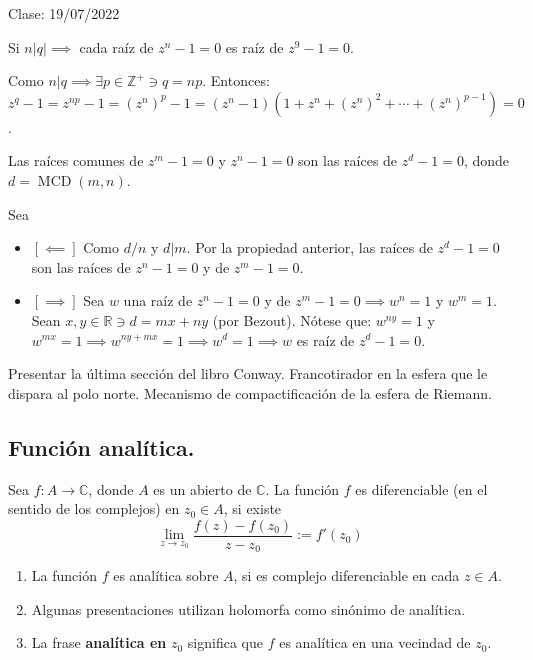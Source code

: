 Clase: 19/07/2022


\begin{prop}
    Si $n|q|\implies $ cada raíz de $z^n-1=0$ es raíz de $z^9 -1 =0$.
    \begin{dem}
        Como $n|q\implies \exists p\in \mathbb{Z}^+\ni q =np$. Entonces: $z^q -1 = z^{np}-1 = (z^n)^p -1 = (z^n -1)(1+z^n +(z^n)^2+\cdots + (z^n)^{p-1}) = 0$. 
    \end{dem}
\end{prop}

\begin{teorema}
    Las raíces comunes de $z^m -1 = 0$ y $z^n -1 =0$ son las raíces de $z^d-1=0$, donde $d= \operatorname{MCD}(m,n)$.
    \begin{dem}
        Sea 
        \begin{itemize}
            \item $[\impliedby]$ Como $d/n$ y $d|m$. Por la propiedad anterior, las raíces de $z^d -1 =0$ son las raíces de $z^n-1 =0$ y de $z^m -1 = 0$. 
            \item $[\implies]$ Sea $w$ una raíz de $z^n-1=0$  y de $z^m-1=0\implies w^n=1$ y $w^m =1$. Sean $x,y\in\mathbb{R}\ni d = mx+ny$ (por Bezout). Nótese que: 
            $w^{ny}=1$ y $w^{mx}=1\implies w^{ny+mx}=1\implies w^d =1\implies w$ es raíz de $z^d-1=0$.
        \end{itemize}
    \end{dem}
\end{teorema}


\begin{cajita}
    Presentar la última sección del libro Conway. Francotirador en la esfera que le dispara al polo norte. Mecanismo de compactificación de la esfera de Riemann. 
\end{cajita}


\subsection{Función analítica.}

\begin{definicion}
    Sea $f: A\to \mathbb{C}$, donde $A$ es un abierto de $\mathbb{C}$. La función $f$ es diferenciable (en el sentido de los complejos) en $z_0\in A$, si existe 
    $$\lim_{z\to z_0}\frac{f(z)-f(z_0)}{z-z_0} := f'(z_0)$$
\end{definicion}

\begin{nota}
    \begin{enumerate}
        \item La función $f$ es analítica sobre $A$, si es complejo diferenciable en cada $z\in A$. 
        \item Algunas presentaciones utilizan holomorfa como sinónimo de analítica. 
        \item La frase \textbf{analítica en} $z_0$ significa que $f$ es analítica en una vecindad de $z_0$.    
    \end{enumerate}
\end{nota}

